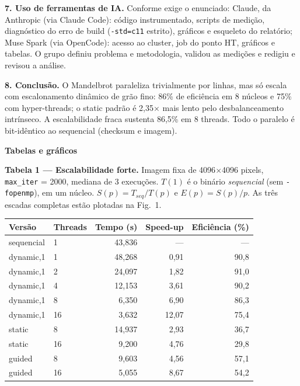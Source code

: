 \documentclass[10pt,a4paper,twocolumn]{article}
\begin{document}
\textbf{7. Uso de ferramentas de IA.}
Conforme exige o enunciado: Claude, da Anthropic (via Claude Code): código
instrumentado, scripts de medição, diagnóstico do erro de build
(\texttt{-std=c11} estrito), gráficos e esqueleto do relatório; Muse Spark
(via OpenCode): acesso ao cluster, job do ponto HT, gráficos e tabelas. O
grupo definiu problema e metodologia, validou as medições e redigiu e revisou
a análise.

\textbf{8. Conclusão.}
O Mandelbrot paraleliza trivialmente por linhas, mas só escala com
escalonamento dinâmico de grão fino: 86\% de eficiência em 8 núcleos e 75\%
com hyper-threads; o static padrão é 2,35$\times$ mais lento pelo
desbalanceamento intrínseco. A escalabilidade fraca sustenta 86,5\% em 8
threads. Todo o paralelo é bit-idêntico ao sequencial (checksum e imagem).

\onecolumn
\newpage

\begin{center}\textbf{\large Tabelas e gráficos}\end{center}

\textbf{Tabela 1 --- Escalabilidade forte.} Imagem fixa de
4096$\times$4096 pixels, \texttt{max\_iter} = 2000, mediana de 3 execuções.
$T(1)$ é o binário \emph{sequencial} (sem \texttt{-fopenmp}), em um núcleo.
$S(p) = T_{seq}/T(p)$ e $E(p) = S(p)/p$. As três escadas completas estão
plotadas na Fig.~1.\\[2pt]
\begin{tabular}{llrrr}
\toprule
Versão & Threads & Tempo (s) & Speed-up & Eficiência (\%) \\
\midrule
sequencial & 1  & 43,836 & --- & --- \\
dynamic,1  & 1  & 48,268 & 0,91 & 90,8 \\
dynamic,1  & 2  & 24,097 & 1,82 & 91,0 \\
dynamic,1  & 4  & 12,153 & 3,61 & 90,2 \\
dynamic,1  & 8  &  6,350 & 6,90 & 86,3 \\
dynamic,1  & 16 &  3,632 & 12,07 & 75,4 \\
static     & 8  & 14,937 & 2,93 & 36,7 \\
static     & 16 &  9,200 & 4,76 & 29,8 \\
guided     & 8  &  9,603 & 4,56 & 57,1 \\
guided     & 16 &  5,055 & 8,67 & 54,2 \\
\bottomrule
\end{tabular}
\end{document}
